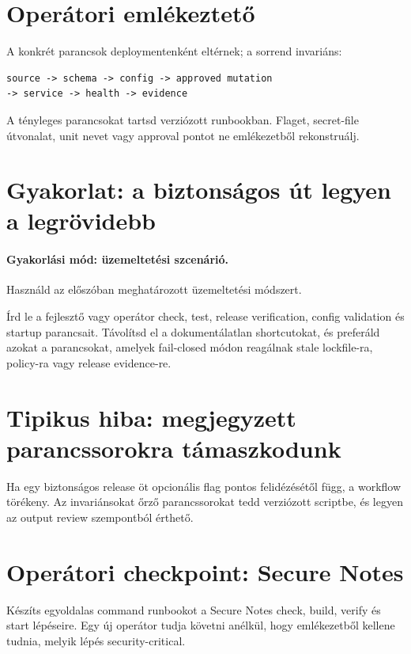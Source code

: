 \section{Operátori emlékeztető}

A konkrét parancsok deploymentenként eltérnek; a sorrend invariáns:

\begin{lstlisting}
source -> schema -> config -> approved mutation
-> service -> health -> evidence
\end{lstlisting}

A tényleges parancsokat tartsd verziózott runbookban. Flaget, secret-file útvonalat, unit nevet vagy approval pontot ne emlékezetből rekonstruálj.

\section{Gyakorlat: a biztonságos út legyen a legrövidebb}
\paragraph{Gyakorlási mód: üzemeltetési szcenárió.} Használd az előszóban meghatározott üzemeltetési módszert.

Írd le a fejlesztő vagy operátor check, test, release verification, config validation és startup parancsait. Távolítsd el a dokumentálatlan shortcutokat, és preferáld azokat a parancsokat, amelyek fail-closed módon reagálnak stale lockfile-ra, policy-ra vagy release evidence-re.

\section{Tipikus hiba: megjegyzett parancssorokra támaszkodunk}
Ha egy biztonságos release öt opcionális flag pontos felidézésétől függ, a workflow törékeny. Az invariánsokat őrző parancssorokat tedd verziózott scriptbe, és legyen az output review szempontból érthető.

\section{Operátori checkpoint: Secure Notes}
Készíts egyoldalas command runbookot a Secure Notes check, build, verify és start lépéseire. Egy új operátor tudja követni anélkül, hogy emlékezetből kellene tudnia, melyik lépés security-critical.
